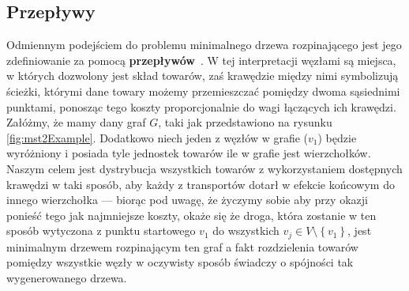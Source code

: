 \subsection{Przepływy}

Odmiennym podejściem do problemu minimalnego drzewa rozpinającego jest jego zdefiniowanie za pomocą \textbf{przepływów}~\cite[$38$--$44$]{Magnanti1995503}. W tej interpretacji węzłami są miejsca, w których dozwolony jest skład towarów, zaś krawędzie między nimi symbolizują ścieżki, którymi dane towary możemy przemieszczać pomiędzy dwoma sąsiednimi punktami, ponosząc tego koszty proporcjonalnie do wagi łączących ich krawędzi. Załóżmy, że mamy dany graf $G$, taki jak przedstawiono na rysunku \ref{fig:mst2Example}. Dodatkowo niech jeden z węzłów w grafie ($v_{1}$) będzie wyróżniony i posiada tyle jednostek towarów ile w grafie jest wierzchołków. Naszym celem jest dystrybucja wszystkich towarów z wykorzystaniem dostępnych krawędzi w taki sposób, aby każdy z transportów dotarł w efekcie końcowym do innego wierzchołka --- biorąc pod uwagę, że życzymy sobie aby przy okazji ponieść tego jak najmniejsze koszty, okaże się że droga, która zostanie w ten sposób wytyczona z punktu startowego $v_{1}$ do wszystkich $ v_{j} \in V \setminus \left\{ v_{1} \right\}$, jest minimalnym drzewem rozpinającym ten graf a fakt rozdzielenia towarów pomiędzy wszystkie węzły w oczywisty sposób świadczy o spójności tak wygenerowanego drzewa.


